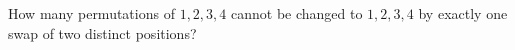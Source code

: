 How many permutations of $1,2,3,4$ cannot be changed to $1,2,3,4$ by exactly one swap of two distinct positions?
